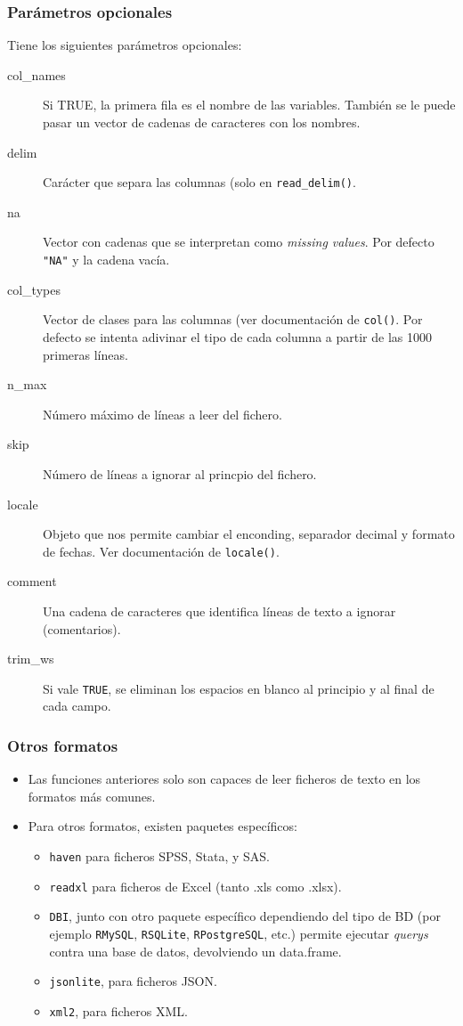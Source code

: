 \documentclass{beamer}
\begin{document}
\begin{frame}[allowframebreaks]
\frametitle{Parámetros opcionales}

Tiene los siguientes parámetros opcionales:
\begin{description}
\item[col\_names] Si TRUE, la primera fila es el nombre de las variables. También se le puede pasar un vector de cadenas de caracteres con los nombres.
\item[delim] Carácter que separa las columnas (solo en \texttt{read\_delim()}.
\item[na] Vector con cadenas que se interpretan como \textit{missing values}. Por defecto \texttt{"NA"} y la cadena vacía.
\item[col\_types] Vector de clases para las columnas (ver documentación de \texttt{col()}. Por defecto se intenta adivinar el tipo de cada columna a partir de las 1000 primeras líneas.
\framebreak
\item[n\_max] Número máximo de líneas a leer del fichero.
\item[skip] Número de líneas a ignorar al princpio del fichero.
\item[locale] Objeto que nos permite cambiar el enconding, separador decimal y formato de fechas. Ver documentación de \texttt{locale()}.
\item[comment] Una cadena de caracteres que identifica líneas de texto a ignorar (comentarios).
\item[trim\_ws] Si vale \texttt{TRUE}, se eliminan los espacios en blanco al principio y al final de cada campo.
\end{description}
\end{frame}


\begin{frame}
\frametitle{Otros formatos}
\begin{itemize}
\item Las funciones anteriores solo son capaces de leer ficheros de texto en los formatos más comunes.
\item Para otros formatos, existen paquetes específicos:
\begin{itemize}
\item \texttt{haven} para ficheros SPSS, Stata, y SAS.
\item \texttt{readxl} para ficheros de Excel (tanto .xls como .xlsx).
\item \texttt{DBI}, junto con otro paquete específico dependiendo del tipo de BD (por ejemplo \texttt{RMySQL}, \texttt{RSQLite}, \texttt{RPostgreSQL}, etc.) permite ejecutar \textit{querys} contra una base de datos, devolviendo un data.frame.
\item \texttt{jsonlite}, para ficheros JSON.
\item \texttt{xml2}, para ficheros XML.
\end{itemize}
\end{itemize}
\end{frame}
\end{document}
